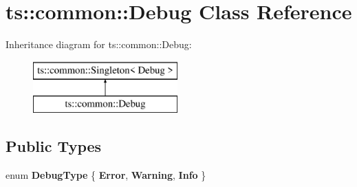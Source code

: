 \hypertarget{classts_1_1common_1_1_debug}{}\section{ts\+:\+:common\+:\+:Debug Class Reference}
\label{classts_1_1common_1_1_debug}
Inheritance diagram for ts\+:\+:common\+:\+:Debug\+:\begin{figure}[H]
\begin{center}
\leavevmode
\includegraphics[height=2.000000cm]{classts_1_1common_1_1_debug}
\end{center}
\end{figure}
\subsection*{Public Types}
\begin{DoxyCompactItemize}
\item 
\mbox{\label{classts_1_1common_1_1_debug_af0648abcd4bc4ae39293f0957caa2930}} 
enum {\bfseries Debug\+Type} \{ {\bfseries Error}, 
{\bfseries Warning}, 
{\bfseries Info}
 \}
\end{DoxyCompactItemize}
